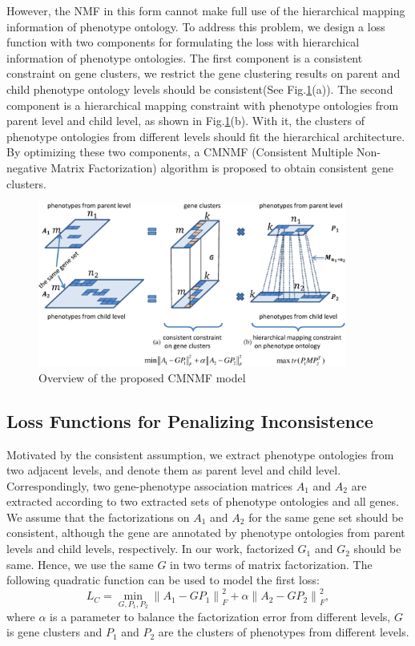 \documentclass{bmcart}
\begin{document}
However, the NMF in this form cannot make full use of the hierarchical mapping information of phenotype ontology. To address this problem, we design a loss function with two components for formulating the loss with hierarchical information of phenotype ontologies. The first component is a consistent constraint on gene clusters, we restrict the gene clustering results on parent and child phenotype ontology levels should be consistent(See Fig.\ref{fig:cmnmf}(a)). The second component is a hierarchical mapping constraint with phenotype ontologies from parent level and child level, as shown in Fig.\ref{fig:cmnmf}(b). With it, the clusters of phenotype ontologies from different levels should fit the hierarchical architecture. By optimizing these two components, a CMNMF (Consistent Multiple Non-negative Matrix Factorization) algorithm is proposed to obtain consistent gene clusters.
\begin{figure}
\centering
\includegraphics[width=4in]{fig/model.pdf}
\caption{Overview of the proposed CMNMF model}
\label{fig:cmnmf}
\end{figure}

\subsection*{Loss Functions for Penalizing Inconsistence}

Motivated by the consistent assumption, we extract phenotype ontologies from two adjacent levels, and  denote them as parent level and child level. Correspondingly, two gene-phenotype association matrices $A_{1}$ and $A_{2}$ are extracted according to two extracted sets of phenotype ontologies and all genes. We assume that the factorizations on $A_{1}$ and $A_{2}$ for the same gene set should be consistent, although the gene are annotated by phenotype ontologies from parent levels and child levels, respectively. In our work, factorized $G_{1}$ and $G_{2}$ should be same. Hence, we use the same $G$ in two terms of matrix factorization. The following quadratic function can be used to model the first loss:
\begin{equation}
\label{eqn:LC}
{L_C} = \mathop {\min }\limits_{G,{P_1},{P_2}} \left\| {{A_1} - G{P_1}} \right\|_F^2 + \alpha \left\| {{A_2} - G{P_2}} \right\|_F^2,
\end{equation}
where $\alpha$ is a parameter to balance the factorization error from different levels, $G$ is gene clusters and $P_1$ and $P_2$ are the clusters of phenotypes from different levels.
\end{document}
